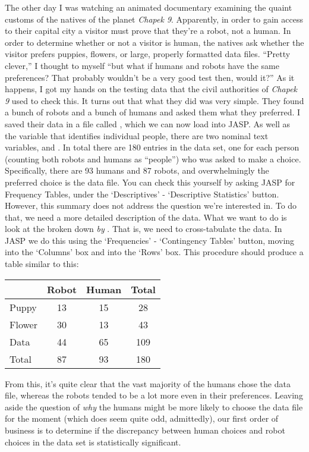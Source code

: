 \noindent
The other day I was watching an animated documentary examining the quaint customs of the natives of the planet {\it Chapek 9}. Apparently, in order to gain access to their capital city a visitor must prove that they're a robot, not a human. In order to determine whether or not a visitor is human, the natives ask whether the visitor prefers puppies, flowers, or large, properly formatted data files. ``Pretty clever,'' I thought to myself ``but what if humans and robots have the same preferences? That probably wouldn't be a very good test then, would it?'' As it happens, I got my hands on the testing data that the civil authorities of {\it Chapek 9} used to check this. It turns out that what they did was very simple. They found a bunch of robots and a bunch of humans and asked them what they preferred. I saved their data in a file called , which we can now load into JASP. As well as the  variable that identifies individual people, there are two nominal text variables,  and . In total there are 180 entries in the data set, one for each person (counting both robots and humans as ``people'') who was asked to make a choice. Specifically, there are 93 humans and 87 robots, and overwhelmingly the preferred choice is the data file. You can check this yourself by asking JASP for Frequency Tables, under the `Descriptives' - `Descriptive Statistics' button. However, this summary does not address the question we're interested in. To do that, we need a more detailed description of the data. What we want to do is look at the  broken down {\it by} . That is, we need to cross-tabulate the data. In JASP we do this using the `Frequencies' - `Contingency Tables' button, moving  into the `Columns' box and  into the `Rows' box. This procedure should produce a table similar to this:
\begin{center}
\begin{tabular}{l|cc|c}
          & Robot & Human & Total \\ \hline
Puppy     & 13 & 15 & 28 \\ 
Flower    & 30 & 13 & 43 \\
Data      & 44 & 65 & 109 \\ \hline
Total     & 87 & 93 & 180
\end{tabular}
\end{center}

From this, it's quite clear that the vast majority of the humans chose the data file, whereas the robots tended to be a lot  more even in their preferences. Leaving aside the question of {\it why} the humans might be more likely to choose the data file for the moment (which does seem quite odd, admittedly), our first order of business is to determine if the discrepancy between human choices and robot choices in the data set is statistically significant.

